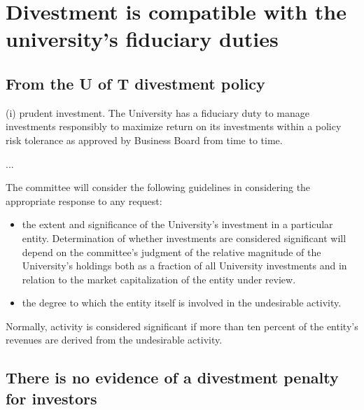 


\section {Divestment is compatible with the university's fiduciary duties}



\subsection {From the U of T divestment policy}
\begin{itquote}	
(i) prudent investment. The University has a fiduciary duty to manage investments responsibly to maximize return on its investments within a policy risk tolerance as approved by Business Board from time to time.

...

The committee will consider the following guidelines in considering the appropriate response to any request:
\begin{itemize}
  \item the extent and significance of the University's investment in a particular entity. Determination of whether investments are considered significant will depend on the committee’s judgment of the relative magnitude of the University’s holdings both as a fraction of all University investments and in relation to the market capitalization of the entity under review.
  \item the degree to which the entity itself is involved in the undesirable activity.
\end{itemize}
Normally, activity is considered significant if more than ten percent of the entity's revenues are derived from the undesirable activity.
\end{itquote}

\subsection {There is no evidence of a divestment penalty for investors}

